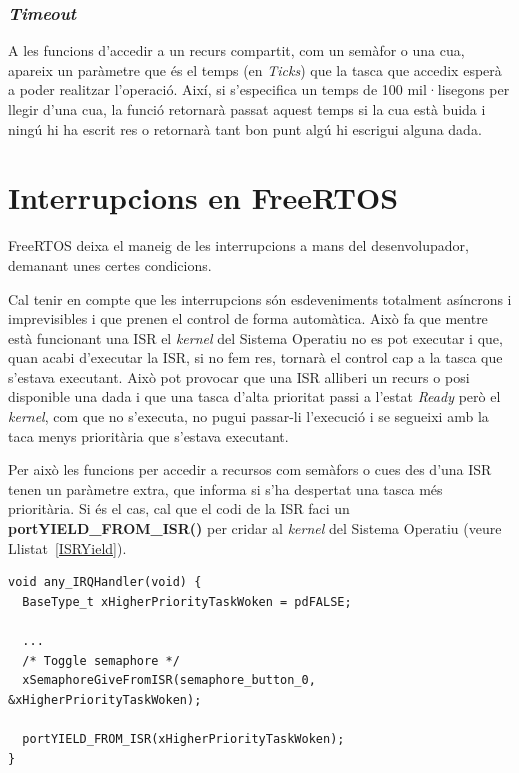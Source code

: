 \subsubsection{\em Timeout}
A les funcions d'accedir a un recurs compartit, com un semàfor o una cua, apareix un paràmetre que és el temps (en {\em Ticks}) que la tasca que accedix esperà a poder realitzar l'operació. Així, si s'especifica un temps de 100 mil·lisegons per llegir d'una cua, la funció retornarà passat aquest temps si la cua està buida i ningú hi ha escrit res o retornarà tant bon punt algú hi escrigui alguna dada.

\section{Interrupcions en FreeRTOS}
\label{ch:FreeRTOSIRQ}

FreeRTOS deixa el maneig de les interrupcions a mans del desenvolupador, demanant unes certes condicions.

Cal tenir en compte que les interrupcions són esdeveniments totalment asíncrons i imprevisibles i que prenen el control de forma automàtica. Això fa que mentre està funcionant una \gls{ISR} el {\em kernel} del Sistema Operatiu no es pot executar i que, quan acabi d'executar la ISR, si no fem res, tornarà el control cap a la tasca que s'estava executant. Això pot provocar que una ISR alliberi un recurs o posi disponible una dada i que una tasca d'alta prioritat passi a l'estat {\em Ready} però el {\em kernel}, com que no s'executa, no pugui passar-li l'execució i se segueixi amb la taca menys prioritària que s'estava executant.

Per això les funcions per accedir a recursos com semàfors o cues des d'una \gls{ISR} tenen un paràmetre extra, que informa si s'ha despertat una tasca més prioritària. Si és el cas, cal que el codi de la ISR faci un {\bf portYIELD\_FROM\_ISR()} per cridar al {\em kernel} del Sistema Operatiu (veure Llistat~\ref{ISRYield}).

\begin{lstlisting}[style=customc,caption=Codi ISR d'exemple,label=ISRYield]
void any_IRQHandler(void) {
  BaseType_t xHigherPriorityTaskWoken = pdFALSE;

  ...
  /* Toggle semaphore */
  xSemaphoreGiveFromISR(semaphore_button_0, &xHigherPriorityTaskWoken);

  portYIELD_FROM_ISR(xHigherPriorityTaskWoken);
}
\end{lstlisting}

